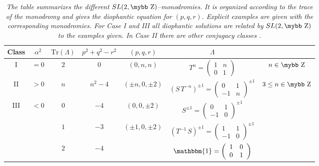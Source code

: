 \documentclass[12pt,a4paper]{article}
\newcommand{\id}{\mathbbm{1}}
\def\bb#1{\hbox{\mybb#1}}
\begin{document}
\begin{table}[ht]
\begin{center}
\begin{tabular}{||c|c|c|c||c|c||c||}
  \hline \rule[-1mm]{0mm}{6mm}
  Class & $\alpha^2$ & $\text{Tr}(\Lambda)$ & $p^2+q^2-r^2$ &
    $(p,q,r)$ & $\Lambda$ & \\
  \hline \hline \rule[-5mm]{0mm}{12mm}
  I & $=0$ & $2$ & $0$ & $(0,n,n)$
    & $T^n= \left( \begin{array}{cc} 1 & n \\ 0 & 1 \end{array}\right)$
    & $n\in \bb{Z}$ \\
  \hline \rule[-5mm]{0mm}{13mm}
  II & $>0$ & $n$ & $n^2-4$ & $(\pm n,0,\pm 2)$
     & $(S \, T^{-n})^{\pm 1}=
     \left( \begin{array}{cc} 0 & 1 \\ -1 & n \end{array} \right)^{\pm 1}$
     & $3 \leq n\in \bb{Z}$ \\
  \hline \rule[-5mm]{0mm}{13mm}
  III & $<0$ & $0$ & $-4$ & $(0,0,\pm 2)$
      & $S^{\pm 1}=
      \left( \begin{array}{cc} 0 & 1 \\ -1 & 0 \end{array} \right)^{\pm 1}$
      & \\
    & & $1$ & $-3$ & $(\pm 1,0,\pm 2)$ & $(T^{-1} \, S)^{\pm 1}=
      \left( \begin{array}{cc} 1 & 1 \\ -1 & 0 \end{array} \right)^{\pm 1}$
      & \\ \rule[-5mm]{0mm}{12mm}
    & & $2$ & $-4$ &
      & $\id=\left( \begin{array}{cc} 1 & 0 \\ 0 & 1 \end{array} \right)$
      & \\
\hline
\end{tabular}
\caption{\it The table summarizes the different
$SL(2,\bb{Z})$--monodromies. It is organized according to the trace of
the monodromy and gives the diophantic equation for $(p,q,r)$. Explicit
examples are given with the corresponding monodromies. For Case I and III
all diophantic solutions are related by $SL(2,\bb{Z})$ to the examples given.
In Case II there are other conjugacy classes \cite{DeWolfe:1998eu, DeWolfe:1998pr}.}
\end{center}
\end{table}
\end{document}
